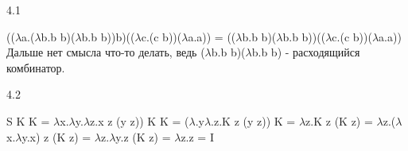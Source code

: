 ﻿\documentclass{article}
\begin{document}
4.1

(($\lambda$a.($\lambda$b.b b)($\lambda$b.b b))b)(($\lambda$c.(c b))($\lambda$a.a)) = (($\lambda$b.b b)($\lambda$b.b b))(($\lambda$c.(c b))($\lambda$a.a))
Дальше нет смысла что-то делать, ведь ($\lambda$b.b b)($\lambda$b.b b) - расходящийся комбинатор.
$$$$

4.2

S K K = $\lambda$x.$\lambda$y.$\lambda$z.x z (y z)) K K = ($\lambda$.y$\lambda$.z.K z (y z)) K = $\lambda$z.K z (K z) = $\lambda$z.($\lambda$x.$\lambda$y.x) z (K z) =
$\lambda$z.$\lambda$y.z (K z) = $\lambda$z.z = I
\end{document}
